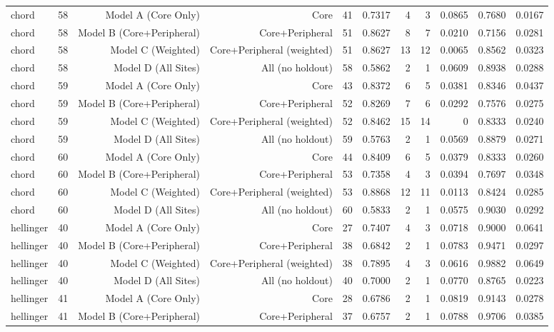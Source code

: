 {\begin{longtable}{lrrrrrrrrrr}
  chord & 58 & Model A (Core Only) & Core & 41 & 0.7317 & 4 & 3 & 0.0865 & 0.7680 & 0.0167 \\
  chord & 58 & Model B (Core+Peripheral) & Core+Peripheral & 51 & 0.8627 & 8 & 7 & 0.0210 & 0.7156 & 0.0281 \\
  chord & 58 & Model C (Weighted) & Core+Peripheral (weighted) & 51 & 0.8627 & 13 & 12 & 0.0065 & 0.8562 & 0.0323 \\
  chord & 58 & Model D (All Sites) & All (no holdout) & 58 & 0.5862 & 2 & 1 & 0.0609 & 0.8938 & 0.0288 \\
  chord & 59 & Model A (Core Only) & Core & 43 & 0.8372 & 6 & 5 & 0.0381 & 0.8346 & 0.0437 \\
  chord & 59 & Model B (Core+Peripheral) & Core+Peripheral & 52 & 0.8269 & 7 & 6 & 0.0292 & 0.7576 & 0.0275 \\
  chord & 59 & Model C (Weighted) & Core+Peripheral (weighted) & 52 & 0.8462 & 15 & 14 & 0 & 0.8333 & 0.0240 \\
  chord & 59 & Model D (All Sites) & All (no holdout) & 59 & 0.5763 & 2 & 1 & 0.0569 & 0.8879 & 0.0271 \\
  chord & 60 & Model A (Core Only) & Core & 44 & 0.8409 & 6 & 5 & 0.0379 & 0.8333 & 0.0260 \\
  chord & 60 & Model B (Core+Peripheral) & Core+Peripheral & 53 & 0.7358 & 4 & 3 & 0.0394 & 0.7697 & 0.0348 \\
  chord & 60 & Model C (Weighted) & Core+Peripheral (weighted) & 53 & 0.8868 & 12 & 11 & 0.0113 & 0.8424 & 0.0285 \\
  chord & 60 & Model D (All Sites) & All (no holdout) & 60 & 0.5833 & 2 & 1 & 0.0575 & 0.9030 & 0.0292 \\
  hellinger & 40 & Model A (Core Only) & Core & 27 & 0.7407 & 4 & 3 & 0.0718 & 0.9000 & 0.0641 \\
  hellinger & 40 & Model B (Core+Peripheral) & Core+Peripheral & 38 & 0.6842 & 2 & 1 & 0.0783 & 0.9471 & 0.0297 \\
  hellinger & 40 & Model C (Weighted) & Core+Peripheral (weighted) & 38 & 0.7895 & 4 & 3 & 0.0616 & 0.9882 & 0.0649 \\
  hellinger & 40 & Model D (All Sites) & All (no holdout) & 40 & 0.7000 & 2 & 1 & 0.0770 & 0.8765 & 0.0223 \\
  hellinger & 41 & Model A (Core Only) & Core & 28 & 0.6786 & 2 & 1 & 0.0819 & 0.9143 & 0.0278 \\
  hellinger & 41 & Model B (Core+Peripheral) & Core+Peripheral & 37 & 0.6757 & 2 & 1 & 0.0788 & 0.9706 & 0.0385 \\

\end{longtable}}
